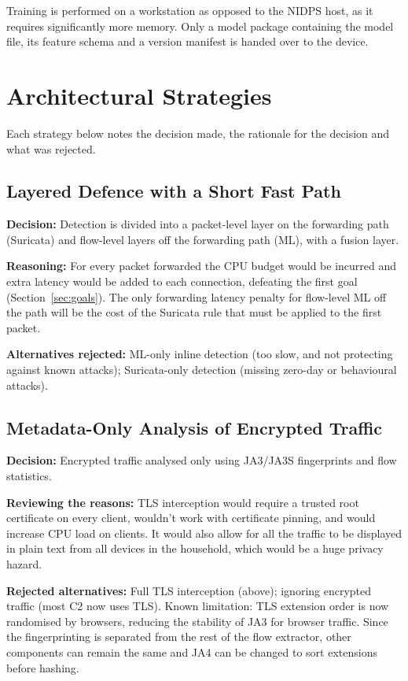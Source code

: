 \noindent Training is performed on a workstation as opposed to the NIDPS host, as it requires significantly more memory. Only a model package containing the model file, its feature schema and a version manifest is handed over to the device.

\section{Architectural Strategies}\label{sec:6.4}
\label{sec:archstrategies}
\noindent Each strategy below notes the decision made, the rationale for the decision and what was rejected.

\subsection{Layered Defence with a Short Fast Path}\label{sec:6.4.1}
\noindent \textbf{Decision:} Detection is divided into a packet-level layer on the forwarding path (Suricata) and flow-level layers off the forwarding path (ML), with a fusion layer.

\noindent \textbf{Reasoning:} For every packet forwarded the CPU budget would be incurred and extra latency would be added to each connection, defeating the first goal (Section~\ref{sec:goals}). The only forwarding latency penalty for flow-level ML off the path will be the cost of the Suricata rule that must be applied to the first packet.

\noindent \textbf{Alternatives rejected:} ML-only inline detection (too slow, and not protecting against known attacks); Suricata-only detection (missing zero-day or behavioural attacks).
\subsection{Metadata-Only Analysis of Encrypted Traffic}\label{sec:6.4.2}
\noindent \textbf{Decision:} Encrypted traffic analysed only using JA3/JA3S fingerprints and flow statistics.

\noindent \textbf{Reviewing the reasons:} TLS interception would require a trusted root certificate on every client, wouldn't work with certificate pinning, and would increase CPU load on clients. It would also allow for all the traffic to be displayed in plain text from all devices in the household, which would be a huge privacy hazard.

\noindent \textbf{Rejected alternatives:} Full TLS interception (above); ignoring encrypted traffic (most C2 now uses TLS). Known limitation: TLS extension order is now randomised by browsers, reducing the stability of JA3 for browser traffic. Since the fingerprinting is separated from the rest of the flow extractor, other components can remain the same and JA4 can be changed to sort extensions before hashing.

